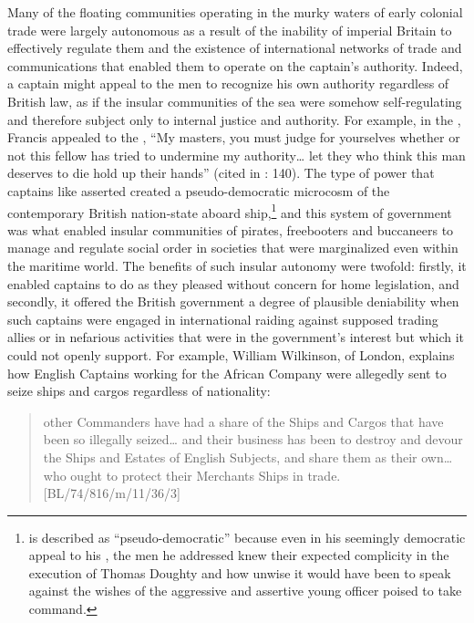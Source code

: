 Many of the floating communities operating in the murky waters of early colonial trade were largely autonomous as a result of the inability of imperial Britain to effectively regulate them and the existence of international networks of  trade and communications that enabled them to operate on the captain’s authority. Indeed, a captain might appeal to the men to recognize his own authority regardless of British law, as if the insular communities of the sea were somehow self-regulating and therefore subject only to internal justice and authority. For example, in the , Francis  appealed to the , “My masters, you must judge for yourselves whether or not this fellow has tried to undermine my authority… let they who think this man deserves to die hold up their hands” (cited in \citealt{Bicheno2012}: 140). The type of power that captains like  asserted created a pseudo-democratic microcosm of the contemporary British nation-state aboard ship,\footnote{ is described as “pseudo-democratic” because even in his seemingly democratic appeal to his , the men he addressed knew their expected complicity in the execution of Thomas Doughty and how unwise it would have been to speak against the wishes of the aggressive and assertive young officer poised to take command.}  and this system of government was what enabled insular communities of pirates, freebooters and buccaneers to manage and regulate social order in societies that were marginalized even within the maritime world. The benefits of such insular autonomy were twofold: firstly, it enabled captains to do as they pleased without concern for home legislation, and secondly, it offered the British government a degree of plausible deniability when such captains were engaged in international raiding against supposed trading allies or in nefarious activities that were in the government’s interest but which it could not openly support. For example, William Wilkinson,  of London, explains how English Captains working for the African Company were allegedly sent to seize  ships and cargos regardless of nationality: 

\begin{quotation}
other Commanders have had a share of the Ships and Cargos that have been so illegally seized… and their business has been to destroy and devour the Ships and Estates of English Subjects, and share them as their own… who ought to protect their Merchants Ships in trade. [BL/74/816/m/11/36/3] 
\end{quotation}

